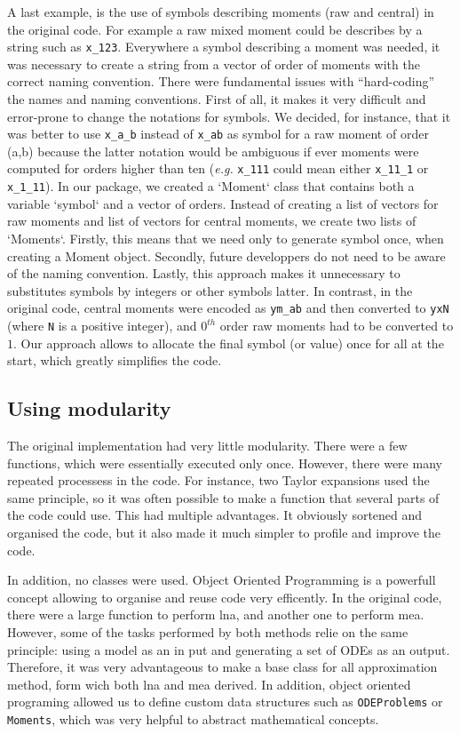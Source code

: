 \documentclass[11pt,a4paper]{article}
\newcommand{\eg}{\emph{e.g.}}
\begin{document}
A last example, is the use of symbols describing moments (raw and central) in the original code.
For example a raw mixed moment could be describes by a string such as \verb"x_123". 
Everywhere a symbol describing a moment was needed, it was necessary to create a string from a vector of order of moments with the correct naming convention.
There were fundamental issues with ``hard-coding'' the names and naming conventions.
First of all, it makes it very difficult and error-prone to change the notations for symbols.
We decided, for instance, that it was better to use \verb"x_a_b" instead of \verb"x_ab" as symbol for a raw moment of order (a,b)
because the latter notation would be ambiguous if ever moments were computed for orders higher than ten (\eg{} \verb"x_111" could mean either \verb"x_11_1"  or \verb"x_1_11").
In our package, we created a `Moment` class that contains both a variable  `symbol` and a vector of orders.
Instead of creating a list of vectors for raw moments and list of vectors for central moments, we create two lists of `Moments`.
Firstly, this means that we need only to generate symbol once, when creating a Moment object.
Secondly, future developpers do not need to be aware of the naming convention.
Lastly, this approach makes it unnecessary to substitutes symbols by integers or other symbols latter.
In contrast, in the original code, central moments were encoded as \verb"ym_ab" and then converted to \verb"yxN" (where \verb"N"  is a positive integer),
and $0^{th}$ order raw moments had to be converted to $1$.
Our approach allows to allocate the final symbol (or value) once for all at the start, which greatly simplifies the code.

\subsection{Using modularity}

The original implementation had very little modularity.
There were a few functions, which  were essentially executed only once.
However, there were many repeated processess in the code.
For instance, two Taylor expansions used the same principle, so it was often possible to make a function that several parts of the code could use. 
This had multiple advantages. 
It obviously sortened and organised the code, but it also made it much simpler to profile and improve the code.
 
In addition, no classes were used.
Object Oriented Programming is a powerfull concept allowing to organise and reuse code very efficently.
In the original code, there were a large function to perform \gls{lna}, and another one to perform \gls{mea}.
However, some of the tasks performed by both methods relie on the same principle: using a model as an in put and generating a set of ODEs as an output.
Therefore, it was very advantageous to make a base class for all approximation method, form wich both \gls{lna} and \gls{mea} derived.
In addition, object oriented programing allowed us to define custom data structures such as \texttt{ODEProblems} or \texttt{Moments},
which was very helpful to abstract mathematical concepts. 
\end{document}
